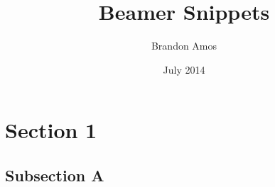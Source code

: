 \documentclass{beamer}
\begin{document}
\title{Beamer Snippets}\author{Brandon Amos}\date{July 2014}

\section{Section 1}
\subsection{Subsection A}
\end{document}
